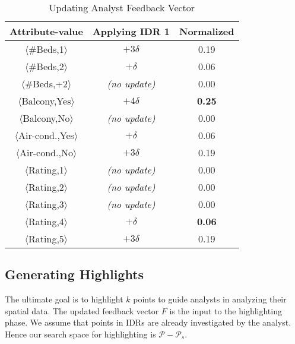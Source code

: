 \documentclass[sigconf,edbt]{acmart-edbt2019}
\begin{document}
\begin{table}[t]
\centering
\caption{Updating Analyst Feedback Vector}
\label{tbl:feedback}
\begin{tabular}{|c|c|c|}
\hline
\textbf{Attribute-value}               & \textbf{Applying IDR 1} & \textbf{Normalized} \\ \hline
$\langle$\#Beds,1$\rangle$                   & $+3\delta$                       & 0.19                 \\ \hline
$\langle$\#Beds,2$\rangle$                 & $+\delta$                       & 0.06                 \\ \hline
$\langle$\#Beds,+2$\rangle$                  & {\em (no update)}                       & 0.00                    \\ \hline
$\langle$Balcony,Yes$\rangle$                   & $+4\delta$                      & {\bf 0.25}                 \\ \hline
$\langle$Balcony,No$\rangle$                    & {\em (no update)}                        & 0.00                    \\ \hline
$\langle$Air-cond.,Yes$\rangle$               & $+\delta$                       & 0.06                 \\ \hline
$\langle$Air-cond.,No$\rangle$                & $+3\delta$                       & 0.19                 \\ \hline
$\langle$Rating,1$\rangle$                    & {\em (no update)}                       & 0.00                    \\ \hline
$\langle$Rating,2$\rangle$                     & {\em (no update)}                        & 0.00                    \\ \hline
$\langle$Rating,3$\rangle$                    & {\em (no update)}                        & 0.00                   \\ \hline
$\langle$Rating,4$\rangle$                   & $+\delta$                       & {\bf 0.06}                 \\ \hline
$\langle$Rating,5$\rangle$                     & $+3\delta$                      & 0.19                 \\ \hline
\end{tabular}
\end{table}

\subsection{Generating Highlights}
The ultimate goal is to highlight $k$ points to guide analysts in analyzing their spatial data. The updated feedback vector $F$ is the input to the highlighting phase. We assume that points in IDRs are already investigated by the analyst. Hence our search space for highlighting is $\mathcal{P} - \mathcal{P}_s$.
\end{document}
